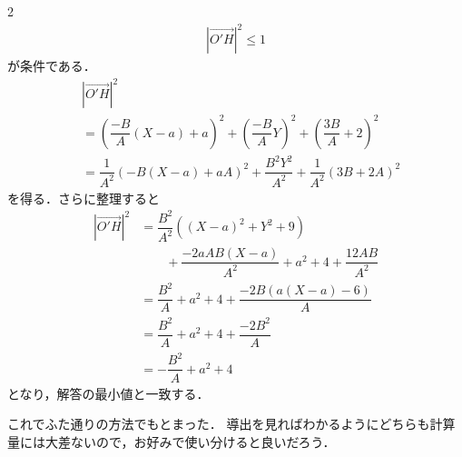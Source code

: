 \documentclass[../../main.tex]{subfiles}
\begin{document}
\begin{multicols}{2}
\begin{align}
    \left|\overrightarrow{O'H}\right|^2 \le 1
  \end{align}
  が条件である．
  \begin{align}
    & \left|\overrightarrow{O'H}\right|^2                                                                          \\
    & = \left(\dfrac{-B}{A}(X-a)+a\right)^2+\left(\dfrac{-B}{A}Y\right)^2 + \left(\dfrac{3B}{A}+2\right)^2 \\
    & = \dfrac{1}{A^2}\left(-B(X-a)+aA\right)^2+\dfrac{B^2Y^2}{A^2} + \dfrac{1}{A^2}\left(3B+2A\right)^2
  \end{align}
  を得る．さらに整理すると
  \begin{align}
    \left|\overrightarrow{O'H}\right|^2
    & = \dfrac{B^2}{A^2}\left((X-a)^2+Y^2+9\right)                       \\
    & \quad \quad + \dfrac{-2aAB(X-a)}{A^2} + a^2 + 4 + \dfrac{12AB}{A^2} \\
    & = \dfrac{B^2}{A} + a^2 + 4 + \dfrac{-2B(a(X-a)-6)}{A}               \\
    & = \dfrac{B^2}{A} + a^2 + 4 + \dfrac{-2B^2}{A}                       \\
    & = -\dfrac{B^2}{A} + a^2 + 4
  \end{align}
  となり，解答の最小値と一致する．

  これでふた通りの方法でもとまった．
  導出を見ればわかるようにどちらも計算量には大差ないので，お好みで使い分けると良いだろう．

  \newpage
\end{multicols}
\end{document}
